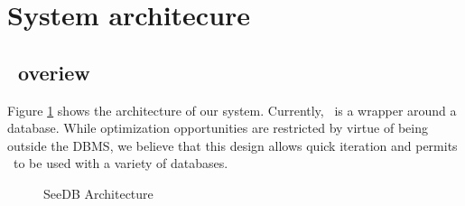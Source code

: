 \section{System architecure}
\label{sec:system_architecture}

\subsection{\SeeDB\ overiew}
\label{subsec:overview}

Figure \ref{fig:sys-arch} shows the architecture of our system. Currently,
\SeeDB\ is a wrapper around a database. While optimization opportunities are
restricted by virtue of being outside the DBMS, we believe that this design
allows quick iteration and permits \SeeDB\ to be used with a variety of
databases.

\begin{figure}[htb]
\centerline{
\hbox{}}
\caption{SeeDB Architecture}
\label{fig:sys-arch}
\end{figure} 

